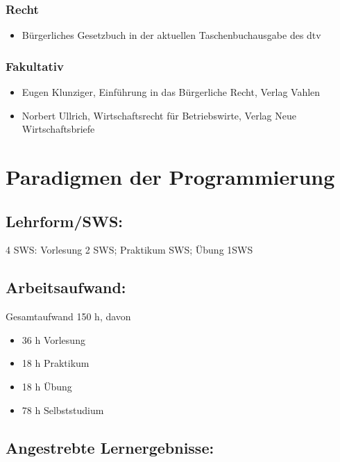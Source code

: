 \subsection*{Recht}\label{recht-2}

\begin{itemize}
\tightlist
\item
  Bürgerliches Gesetzbuch in der aktuellen Taschenbuchausgabe des dtv
\end{itemize}

\subsection*{Fakultativ}\label{fakultativ}

\begin{itemize}
\item
  Eugen Klunziger, Einführung in das Bürgerliche Recht, Verlag Vahlen
\item
  Norbert Ullrich, Wirtschaftsrecht für Betriebswirte, Verlag Neue
  Wirtschaftsbriefe
\end{itemize}

\chapter{Paradigmen der
Programmierung}\label{paradigmen-der-programmierung}

\section*{Lehrform/SWS:}\label{lehrformsws-13}

4 SWS: Vorlesung 2 SWS; Praktikum SWS; Übung 1SWS

\section*{Arbeitsaufwand:}\label{arbeitsaufwand-10}

Gesamtaufwand 150 h, davon

\begin{itemize}
\item
  36 h Vorlesung
\item
  18 h Praktikum
\item
  18 h Übung
\item
  78 h Selbststudium
\end{itemize}

\section*{Angestrebte
Lernergebnisse:}\label{angestrebte-lernergebnisse-17}

